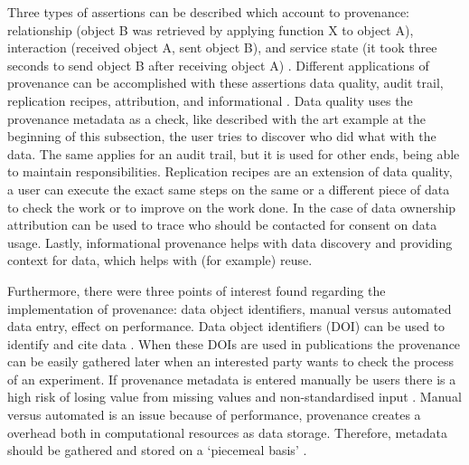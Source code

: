 
Three types of assertions can be described which account to provenance: relationship (object B was retrieved by applying function X to object A), interaction (received object A, sent object B), and service state (it took three seconds to send object B after receiving object A) \cite{dsp4moreau}.
Different applications of provenance can be accomplished with these assertions \eg{} data quality, audit trail, replication recipes, attribution, and informational \cite{dsp1simmhan}.
Data quality uses the provenance metadata as a check, like described with the art example at the beginning of this subsection, the user tries to discover who did what with the data.
The same applies for an audit trail, but it is used for other ends, being able to maintain responsibilities.
Replication recipes are an extension of data quality, a user can execute the exact same steps on the same or a different piece of data to check the work or to improve on the work done.
In the case of data ownership attribution can be used to trace who should be contacted for consent on data usage.
Lastly, informational provenance helps with data discovery and providing context for data, which helps with (for example) reuse.

Furthermore, there were three points of interest found regarding the implementation of provenance: data object identifiers, manual versus automated data entry, effect on performance.
Data object identifiers (DOI) can be used to identify and cite data \cite{dsp1simmhan}.
When these DOIs are used in publications the provenance can be easily gathered later when an interested party wants to check the process of an experiment.
If provenance metadata is entered manually be users there is a high risk of losing value from missing values and non-standardised input \cite{dsp1simmhan}.
Manual versus automated is an issue because of performance, provenance creates a overhead both in computational resources as data storage.
Therefore, metadata should be gathered and stored on a `piecemeal basis' \cite{dsp4moreau}.

